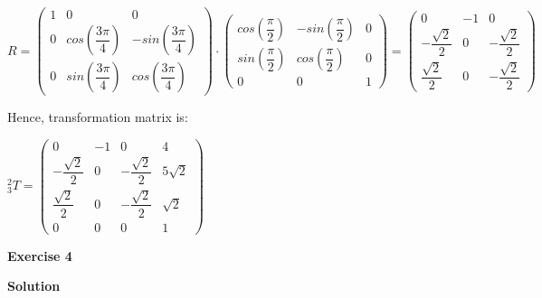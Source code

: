 \documentclass[12pt]{article}
\begin{document}
\begin{list}{)~}{}
$R=
\left(\begin{array}{ccc}
1 & 0 & 0 \\
0 & cos\left( \dfrac{3\pi}{4} \right) & -sin\left( \dfrac{3\pi}{4} \right)  \\
0 & sin\left(\dfrac{3\pi}{4} \right) & cos\left( \dfrac{3\pi}{4} \right)\end{array}\right)
\cdot
\left(\begin{array}{ccc}
cos\left( \dfrac{\pi}{2} \right) & -sin\left( \dfrac{\pi}{2}\right) & 0 \\
sin\left( \dfrac{\pi}{2}\right) & cos\left( \dfrac{\pi}{2}\right) & 0\\
0 & 0 & 1\end{array}\right)=
\left(\begin{array}{ccc}
0 & -1 & 0 \\
-\dfrac{\sqrt{2}}{2} & 0 & -\dfrac{\sqrt{2}}{2} \\
\dfrac{\sqrt{2}}{2} & 0 &  -\dfrac{\sqrt{2}}{2}\end{array}\right)$ 
\end{list}

Hence, transformation matrix is:

$_{3}^{2}T = \left(\begin{array}{cccc}
0 & -1 & 0 & 4 \\
-\dfrac{\sqrt{2}}{2} & 0 & -\dfrac{\sqrt{2}}{2} & 5\sqrt{2}\\
\dfrac{\sqrt{2}}{2} & 0 &  -\dfrac{\sqrt{2}}{2} & \sqrt{2}\\
0 & 0 & 0 & 1\end{array}\right)$

\newpage

\textbf{Exercise 4}		
		
\textbf{Solution}
\end{document}

